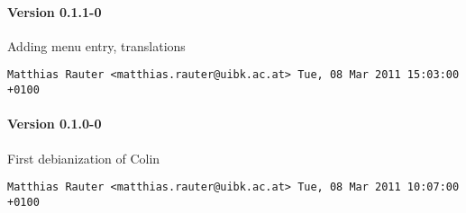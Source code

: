 \paragraph{Version 0.1.1-0}
\begin{compactitem}
\item Adding menu entry, translations
\end{compactitem}
\texttt{Matthias Rauter <matthias.rauter@uibk.ac.at>  Tue, 08 Mar 2011 15:03:00 +0100}
\paragraph{Version 0.1.0-0}
\begin{compactitem}
\item First debianization of Colin
\end{compactitem}
\texttt{Matthias Rauter <matthias.rauter@uibk.ac.at>  Tue, 08 Mar 2011 10:07:00 +0100}
